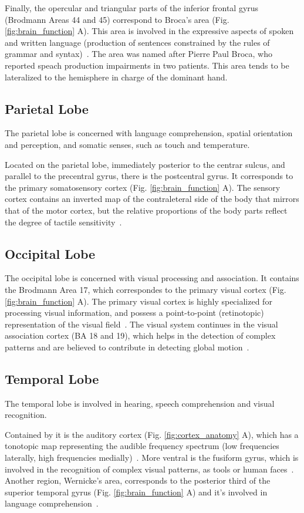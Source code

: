 Finally, the opercular and triangular parts of the inferior frontal gyrus
(Brodmann Areas 44 and 45) correspond to Broca’s area (Fig. \ref{fig:brain_function} A). This area is involved in
the expressive aspects of spoken and written language (production of sentences
constrained by the rules of grammar and syntax)~\cite{Johns}. The area was named
after Pierre Paul Broca, who reported speach production impairments in two patients.
This area tends to be lateralized to the hemisphere in charge of the dominant
hand. 

\subsection{Parietal Lobe}
The parietal lobe is concerned with language comprehension, spatial orientation
and perception, and somatic senses, such as touch and temperature.

Located on the parietal lobe, immediately posterior to the centrar sulcus, and
parallel to the precentral gyrus, there is the postcentral gyrus. It corresponds 
to the primary somatosensory cortex  (Fig. \ref{fig:brain_function} A). The sensory cortex contains
an inverted map of the contraleteral side of the body that mirrors that of the motor
cortex, but the relative proportions of the body parts reflect the degree of 
tactile sensitivity~\cite{Johns}.

\subsection{Occipital Lobe}
The occipital lobe is concerned with visual processing and association.
It contains the Brodmann Area 17, which correspondes to the primary visual cortex (Fig. \ref{fig:brain_function} A).
The primary visual cortex is highly specialized for processing visual information, and
possess a point-to-point (retinotopic) representation of the visual field~\cite{Johns}.
The visual system continues in the visual association cortex (BA 18 and 19),
which helps in the detection of complex patterns and are believed to contribute
in detecting global motion~\cite{Johns, Purves2004}.

\subsection{Temporal Lobe}
The temporal lobe is involved in hearing, speech comprehension and visual recognition.

Contained by it is the auditory cortex (Fig. \ref{fig:cortex_anatomy} A), which 
has a tonotopic map representing the audible frequency spectrum (low frequencies
laterally, high frequencies medially)~\cite{Johns}. More ventral is the fusiform
gyrus, which is involved in the recognition of complex visual patterns, as tools
or human faces~\cite{Saygin2011}. Another region, Wernicke’s area, corresponds to the 
posterior third of the superior temporal gyrus (Fig. \ref{fig:brain_function} A) and
it's involved in language comprehension~\cite{Johns}. 

